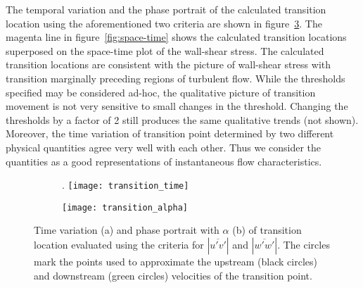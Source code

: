 The temporal variation and the phase portrait of the calculated transition location using the aforementioned two criteria are shown in figure~\ref{fig:transition}. The magenta line in figure~\ref{fig:space-time} shows the calculated transition locations superposed on the space-time plot of the wall-shear stress. The calculated transition locations are consistent with the picture of wall-shear stress with transition marginally preceding regions of turbulent flow. While the thresholds specified may be considered ad-hoc, the qualitative picture of transition movement is not very sensitive to small changes in the threshold. Changing the thresholds by a factor of 2 still produces the same qualitative trends (not shown). Moreover, the time variation of transition point determined by two different physical quantities agree very well with each other. Thus we consider the quantities as a good representations of instantaneous flow characteristics.
\begin{figure}[h]
	\centering
	\begin{subfigure}[t]{0.45\textwidth}
		\centering
		\caption{}. 
		\texttt{[image: transition\_time]}
		\label{fig:transition_time}
	\end{subfigure}
	\begin{subfigure}[t]{0.45\textwidth}
		\centering
		\caption{} 		
		\texttt{[image: transition\_alpha]}
		\label{fig:transition_alpha}
	\end{subfigure}
	\caption{Time variation (a) and phase portrait with $\alpha$ (b) of transition location evaluated using the criteria for $|\overline{u'v'}|$ and $|\overline{w'w'}|$. The circles mark the points used to approximate the upstream (black circles) and downstream (green circles) velocities of the transition point.}
	\label{fig:transition}
\end{figure}


